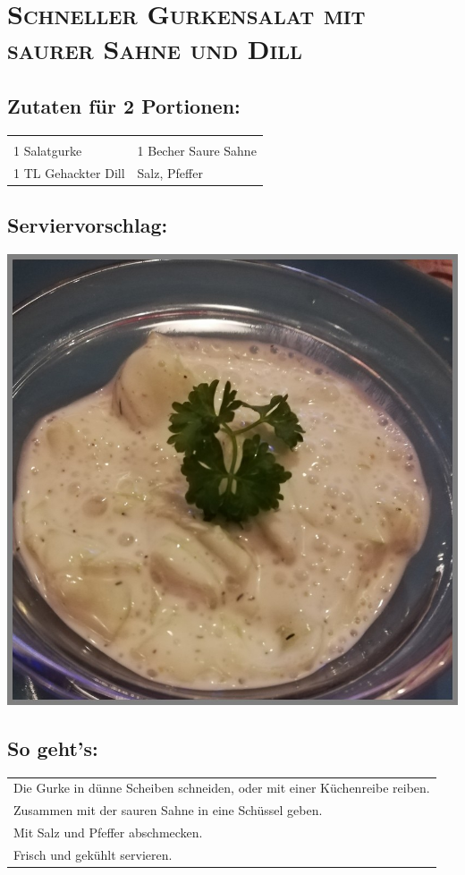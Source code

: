 \section{\textsc{Schneller Gurkensalat mit saurer Sahne und Dill}}

\subsection*{Zutaten für 2 Portionen:}

\begin{tabular}{p{7.5cm} p{7.5cm}}
	& \\
	1 Salatgurke & 1 Becher Saure Sahne \\
	1 TL Gehackter Dill & Salz, Pfeffer
\end{tabular}

\subsection*{Serviervorschlag:}

\includegraphics[width=\textwidth]{img/schneller_gurkensalat.jpg} \cite{gurkensalatdill}

\subsection*{So geht's:}

\begin{tabular}{p{15cm}}
	\\
  Die Gurke in dünne Scheiben schneiden, oder mit einer Küchenreibe reiben.\\
  Zusammen mit der sauren Sahne in eine Schüssel geben.\\
  Mit Salz und Pfeffer abschmecken.\\
  Frisch und gekühlt servieren.
\end{tabular}
